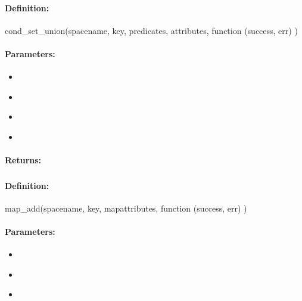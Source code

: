 \paragraph{Definition:}
\begin{javascriptcode}
cond_set_union(spacename, key, predicates, attributes, function (success, err) {})
\end{javascriptcode}
\paragraph{Parameters:}
\begin{itemize}[noitemsep]
\item {}\\

\item {}\\

\item {}\\

\item {}\\

\end{itemize}

\paragraph{Returns:}


\pagebreak
\subsubsection{}
\label{api:nodejs:map_add}


\paragraph{Definition:}
\begin{javascriptcode}
map_add(spacename, key, mapattributes, function (success, err) {})
\end{javascriptcode}
\paragraph{Parameters:}
\begin{itemize}[noitemsep]
\item {}\\

\item {}\\

\item {}\\

\end{itemize}

